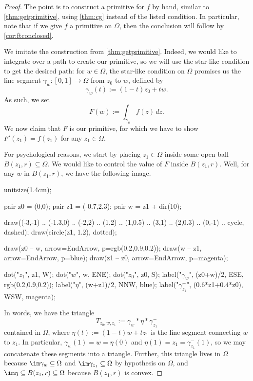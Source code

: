 \begin{proof}
	The point is to construct a primitive for $f$ by hand, similar to \autoref{thm:getprimitive}, using \autoref{thm:cg} instead of the listed condition. In particular, note that if we give $f$ a primitive on $\Omega$, then the conclusion will follow by \autoref{cor:ftconclosed}.
	
	We imitate the construction from \autoref{thm:getprimitive}. Indeed, we would like to integrate over a path to create our primitive, so we will use the star-like condition to get the desired path: for $w\in\Omega$, the star-like condition on $\Omega$ promises us the line segment $\gamma_w:[0,1]\to\Omega$ from $z_0$ to $w$, defined by
	\[\gamma_w(t):=(1-t)z_0+tw.\]
	As such, we set
	\[F(w):=\int_{\gamma_w}f(z)\,dz.\]
	We now claim that $F$ is our primitive, for which we have to show $F'(z_1)=f(z_1)$ for any $z_1\in\Omega$.
	
	For psychological reasons, we start by placing $z_1\in\Omega$ inside some open ball $B(z_1,r)\subseteq\Omega$. We would like to control the value of $F$ inside $B(z_1,r)$. Well, for any $w$ in $B(z_1,r)$, we have the following image.
	\begin{center}
		\begin{asy}
			unitsize(1.4cm);

			pair z0 = (0,0);
			pair z1 = (-0.7,2.3);
			pair w = z1 + dir(10);

			draw((-3,-1) .. (-1.3,0) .. (-2,2) .. (1,2) .. (1,0.5) .. (3,1) .. (2,0.3) .. (0,-1) .. cycle, dashed);
			draw(circle(z1, 1.2), dotted);

			draw(z0 -- w, arrow=EndArrow, p=rgb(0.2,0.9,0.2));
			draw(w -- z1, arrow=EndArrow, p=blue);
			draw(z1 -- z0, arrow=EndArrow, p=magenta);

			dot("$z_1$", z1, W);
			dot("$w$", w, ENE);
			dot("$z_0$", z0, S);
			label("$\gamma_w$", (z0+w)/2, ESE, rgb(0.2,0.9,0.2));
			label("$\eta$", (w+z1)/2, NNW, blue);
			label("$\gamma_{z_1}^-$", (0.6*z1+0.4*z0), WSW, magenta);
		\end{asy}
	\end{center}
	In words, we have the triangle
	\[T_{z_0,w,z_1}:=\gamma_w*\eta*\gamma_{z_1}^-\]
	contained in $\Omega$, where $\eta(t):=(1-t)w+tz_1$ is the line segment connecting $w$ to $z_1$. In particular, $\gamma_w(1)=w=\eta(0)$ and $\eta(1)=z_1=\gamma_{z_1}^-(1)$, so we may concatenate these segments into a triangle. Further, this triangle lives in $\Omega$ because $\im\gamma_w\subseteq\Omega$ and $\im\gamma_{z_1}\subseteq\Omega$ by hypothesis on $\Omega$, and $\im\eta\subseteq B(z_1,r)\subseteq\Omega$ because $B(z_1,r)$ is convex.


\end{proof}
